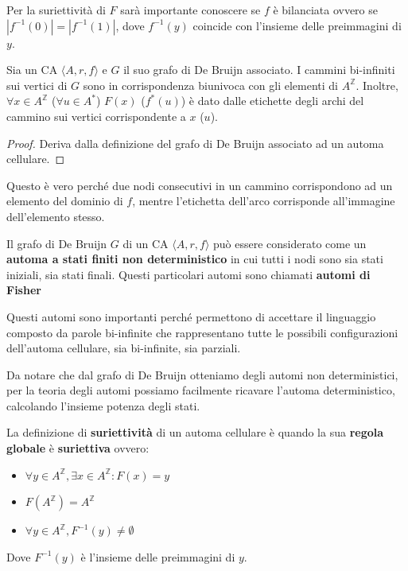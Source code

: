 \begin{nota}
    Per la suriettività di $F$ sarà importante conoscere se $f$ è bilanciata ovvero
    se $|f^{-1}(0)| =|f^{-1}(1)|$, dove $  f^{-1}(y)$ coincide con l'insieme delle
    preimmagini di $y$.
\end{nota}

\begin{nota}
    Sia un CA $\langle A,r,f\rangle$ e $G$ il suo grafo di De Bruijn associato.
    I cammini bi-infiniti sui vertici di $G$ sono in corrispondenza biunivoca
    con gli elementi di $A^\mathbb{Z}$. Inoltre, $\forall x\in A^\mathbb{Z}$ ($ \forall u\in A^\ast$)
    $F(x)$ ($f^\ast(u)$) è dato dalle etichette degli archi del cammino sui vertici
    corrispondente a $x$ ($u$).
    \begin{proof}
        Deriva dalla definizione del grafo di De Bruijn associato ad un automa cellulare.
    \end{proof}
\end{nota}

Questo è vero perché due nodi consecutivi in un cammino corrispondono ad un elemento
del dominio di $f$, mentre l'etichetta dell'arco corrisponde all'immagine dell'elemento
stesso.

\begin{nota}
    Il grafo di De Bruijn $G$ di un CA $\langle A,r,f\rangle$ può essere considerato
    come un \textbf{automa a stati finiti non deterministico} in cui tutti i nodi sono sia stati iniziali, sia
    stati finali. Questi particolari automi sono chiamati \textbf{automi di Fisher}
\end{nota}

Questi automi sono importanti perché permettono di accettare il linguaggio composto
da parole bi-infinite che rappresentano tutte le possibili configurazioni dell'automa
cellulare, sia bi-infinite, sia parziali.

Da notare che dal grafo di De Bruijn otteniamo degli automi non deterministici,
per la teoria degli automi possiamo facilmente ricavare l'automa deterministico,
calcolando l'insieme potenza degli stati.

\begin{definizione} 
    La definizione di \textbf{suriettività} di un automa cellulare è quando la sua
    \textbf{regola globale} è \textbf{suriettiva} ovvero:
    \begin{itemize}
        \item $\forall y\in A^\mathbb{Z},\exists x\in A^\mathbb{Z}: F(x) = y$
        \item $F(A^\mathbb{Z}) = A^\mathbb{Z}$
        \item $\forall y \in A^\mathbb{Z}, F^{-1}(y) \ne \emptyset $
    \end{itemize}
    Dove $F^{-1}(y)$ è l'insieme delle preimmagini di $y$.
\end{definizione}

